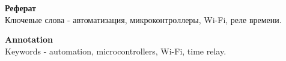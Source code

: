 \textbf{\Large Реферат} \\
Ключевые слова - автоматизация,  микроконтроллеры, Wi-Fi, реле времени.

\newpage

\textbf{\Large Annotation} \\
Keywords - automation, microcontrollers, Wi-Fi, time relay.

